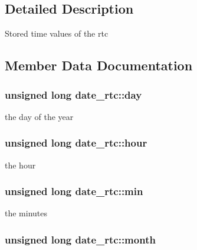 \subsection{Detailed Description}
Stored time values of the rtc 

\subsection{Member Data Documentation}
\subsubsection[{\texorpdfstring{day}{day}}]{\setlength{\rightskip}{0pt plus 5cm}unsigned long date\+\_\+rtc\+::day}\hypertarget{structdate__rtc_aafb65ff718f63c0e56aff1168ab3c154}{}\label{structdate__rtc_aafb65ff718f63c0e56aff1168ab3c154}


the day of the year 

\subsubsection[{\texorpdfstring{hour}{hour}}]{\setlength{\rightskip}{0pt plus 5cm}unsigned long date\+\_\+rtc\+::hour}\hypertarget{structdate__rtc_a4a231dccac478c1e2eb419ee34535e0e}{}\label{structdate__rtc_a4a231dccac478c1e2eb419ee34535e0e}


the hour 

\subsubsection[{\texorpdfstring{min}{min}}]{\setlength{\rightskip}{0pt plus 5cm}unsigned long date\+\_\+rtc\+::min}\hypertarget{structdate__rtc_a6ea5d53162f2139e1e2a8d59bd3083b9}{}\label{structdate__rtc_a6ea5d53162f2139e1e2a8d59bd3083b9}


the minutes 

\subsubsection[{\texorpdfstring{month}{month}}]{\setlength{\rightskip}{0pt plus 5cm}unsigned long date\+\_\+rtc\+::month}\hypertarget{structdate__rtc_a12309edd1455518380682d3241cd4b75}{}\label{structdate__rtc_a12309edd1455518380682d3241cd4b75}


